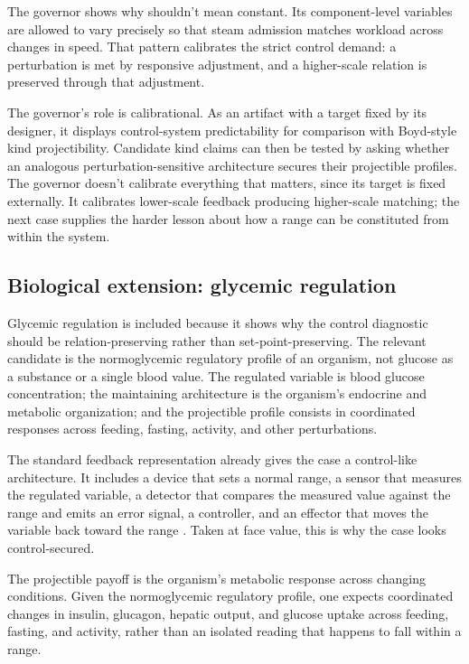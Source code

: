 \documentclass[12pt]{article}
\begin{document}
The governor shows why  shouldn't mean constant. Its
component-level variables are allowed to vary precisely so that steam admission
matches workload across changes in speed. That pattern calibrates the strict
control demand: a perturbation is met by responsive adjustment, and a
higher-scale relation is preserved through that adjustment.

The governor's role is calibrational. As an artifact with a target fixed by its
designer, it displays control-system predictability for comparison with Boyd-style
kind projectibility. Candidate kind claims can then be tested by asking whether an
analogous perturbation-sensitive architecture secures their projectible profiles.
The governor doesn't calibrate everything that matters, since its target is fixed
externally. It calibrates lower-scale feedback producing higher-scale matching;
the next case supplies the harder lesson about how a range can be constituted
from within the system.

\subsection{Biological extension: glycemic regulation}

Glycemic regulation is included because it shows why the control diagnostic should
be relation-preserving rather than set-point-preserving. The relevant candidate is
the normoglycemic regulatory profile of an organism, not glucose as a substance or
a single blood value. The regulated variable is blood glucose concentration; the
maintaining architecture is the organism's endocrine and metabolic organization;
and the projectible profile consists in coordinated responses across feeding,
fasting, activity, and other perturbations.

The standard feedback representation already gives the case a control-like
architecture. It includes a device that sets a normal range, a sensor that
measures the regulated variable, a detector that compares the measured value
against the range and emits an error signal, a controller, and an effector that
moves the variable back toward the range \citep{bichMossioSoto2020}. Taken at
face value, this is why the case looks control-secured.

The projectible payoff is the organism's metabolic response across changing
conditions. Given the normoglycemic regulatory profile, one expects coordinated
changes in insulin, glucagon, hepatic output, and glucose uptake across feeding,
fasting, and activity, rather than an isolated reading that happens to fall within
a range.
\end{document}
